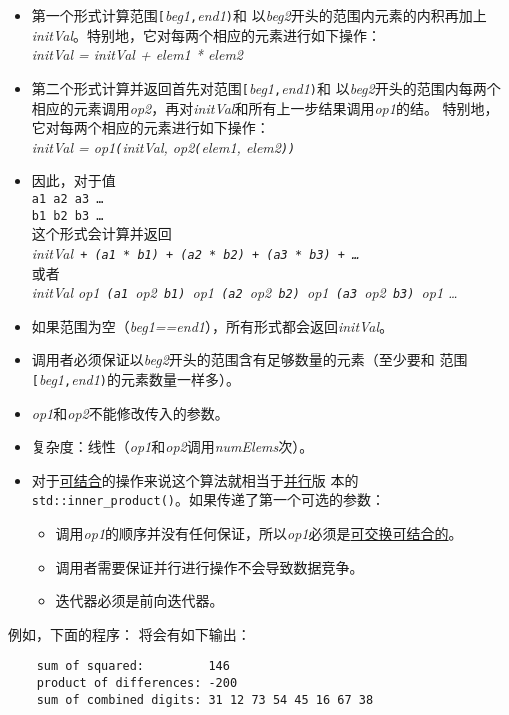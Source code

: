 \begin{itemize}
    \item 第一个形式计算范围\texttt{[}\emph{beg1}\texttt{,}\emph{end1}\texttt{)}和
    以\emph{beg2}开头的范围内元素的内积再加上\emph{initVal}。特别地，它对每两个相应的元素进行如下操作：\\
    \hspace*{2em}\emph{initVal = initVal + elem1 * elem2}
    \item 第二个形式计算并返回首先对范围\texttt{[}\emph{beg1}\texttt{,}\emph{end1}\texttt{)}和
    以\emph{beg2}开头的范围内每两个相应的元素调用\emph{op2}，再对\emph{initVal}和所有上一步结果调用\emph{op1}的结。
    特别地，它对每两个相应的元素进行如下操作：\\
    \hspace*{2em}\emph{initVal = op1\texttt{(}initVal, op2\texttt{(}elem1, elem2\texttt{))}}
    \item 因此，对于值\\
    \hspace*{2em}\texttt{a1 a2 a3 \ldots}\\
    \hspace*{2em}\texttt{b1 b2 b3 \ldots}\\
    这个形式会计算并返回\\
    \hspace*{2em}\emph{initVal\texttt{ + (a1 * b1) + (a2 * b2) + (a3 * b3) + \ldots}}\\
    或者\\
    \hspace*{2em}\emph{initVal op1\texttt{ (a1 }op2\texttt{ b1) }op1\texttt{ (a2 }op2\texttt{ b2) }op1\texttt{ (a3 }op2\texttt{ b3) }op1 \ldots}
    \item 如果范围为空（\emph{beg1==end1}），所有形式都会返回\emph{initVal}。
    \item 调用者必须保证以\emph{beg2}开头的范围含有足够数量的元素（至少要和
    范围\texttt{[}\emph{beg1}\texttt{,}\emph{end1}\texttt{)}的元素数量一样多）。
    \item \emph{op1}和\emph{op2}不能修改传入的参数。
    \item 复杂度：线性（\emph{op1}和\emph{op2}调用\emph{numElems}次）。
    \item 对于\hyperref[ch22.6.1.1]{可结合}的操作来说这个算法就相当于\hyperref[ch22]{并行}版
    本的\texttt{std::inner\_product()}。如果传递了第一个可选的参数：
    \begin{itemize}
        \item 调用\emph{op1}的顺序并没有任何保证，所以\emph{op1}必须是\hyperref[ch22.6.1.1]{可交换可结合的}。
        \item 调用者需要保证并行进行操作不会导致数据竞争。
        \item 迭代器必须是前向迭代器。
    \end{itemize}
\end{itemize}
例如，下面的程序：
将会有如下输出：
\begin{lstlisting}
    sum of squared:         146
    product of differences: -200
    sum of combined digits: 31 12 73 54 45 16 67 38
\end{lstlisting}

